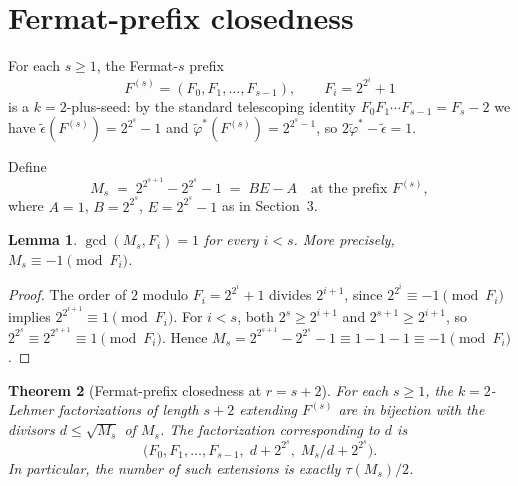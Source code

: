 \documentclass[11pt]{article}
\newtheorem{theorem}{Theorem}
\newtheorem{lemma}[theorem]{Lemma}
\theoremstyle{definition}
\theoremstyle{remark}
\newcommand{\eps}{\tilde{\epsilon}}
\newcommand{\phist}{\tilde{\varphi}^*}
\begin{document}
\section{Fermat-prefix closedness}\label{sec:fermat}

For each $s \ge 1$, the Fermat-$s$ prefix
\[
  F^{(s)} = (F_0, F_1, \ldots, F_{s-1}),
  \qquad F_i = 2^{2^i} + 1
\]
is a $k = 2$-plus-seed: by the standard telescoping identity
$F_0 F_1 \cdots F_{s-1} = F_s - 2$ we have $\eps(F^{(s)}) = 2^{2^s} - 1$
and $\phist(F^{(s)}) = 2^{2^s - 1}$, so $2 \phist - \eps = 1$.

Define
\[
  M_s \;=\; 2^{2^{s+1}} - 2^{2^s} - 1 \;=\; B E - A
  \quad \text{at the prefix } F^{(s)},
\]
where $A = 1$, $B = 2^{2^s}$, $E = 2^{2^s} - 1$ as in
Section~3.

\begin{lemma}\label{lem:Mscoprime}
$\gcd(M_s, F_i) = 1$ for every $i < s$.  More precisely,
$M_s \equiv -1 \pmod{F_i}$.
\end{lemma}

\begin{proof}
The order of $2$ modulo $F_i = 2^{2^i} + 1$ divides $2^{i+1}$, since
$2^{2^i} \equiv -1 \pmod{F_i}$ implies $2^{2^{i+1}} \equiv 1
\pmod{F_i}$.  For $i < s$, both $2^s \ge 2^{i+1}$ and $2^{s+1} \ge
2^{i+1}$, so $2^{2^s} \equiv 2^{2^{s+1}} \equiv 1 \pmod{F_i}$.  Hence
$M_s = 2^{2^{s+1}} - 2^{2^s} - 1 \equiv 1 - 1 - 1 \equiv -1 \pmod{F_i}$.
\end{proof}

\begin{theorem}[Fermat-prefix closedness at $r = s + 2$]\label{thm:fermat}
For each $s \ge 1$, the $k = 2$-Lehmer factorizations of length $s + 2$
extending $F^{(s)}$ are in bijection with the divisors $d \le
\sqrt{M_s}$ of $M_s$.  The factorization corresponding to $d$ is
\[
  \bigl(F_0, F_1, \ldots, F_{s-1},\;
        d + 2^{2^s},\;
        M_s / d + 2^{2^s}\bigr).
\]
In particular, the number of such extensions is exactly $\tau(M_s) / 2$.
\end{theorem}
\end{document}
